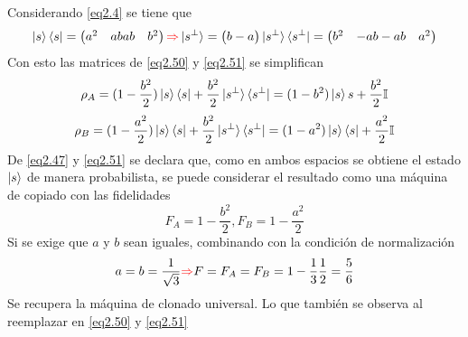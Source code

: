\documentclass{book}
\begin{document}
Considerando \ref{eq2.4} se tiene que 
\begin{equation}\label{eq2.52}{\ket{s}\bra{s}=\begin{pmatrix} a^2 & ab  ab & b^2 \end{pmatrix} \textcolor{red}{\Rightarrow}  \ket{s^\perp}=\begin{pmatrix}b  -a \end{pmatrix} \ket{s^\perp}\bra{s^\perp}=\begin{pmatrix} b^2 & -ab -ab & a^2\end{pmatrix} }\end{equation}
Con esto las matrices de \ref{eq2.50} y \ref{eq2.51} se simplifican
\begin{equation}\label{eq2.53}{\rho_A=(1-\frac{b^2}{2})\ket{s}\bra{s}+ \frac{b^2}{2}\ket{s^\perp}\bra{s^\perp}=(1-b^2)\ket{s}{s}+\frac{b^2}{2} \mathbb{I}}\end{equation}
\begin{equation} \label{eq2.54}{ \rho_B= (1-\frac{a^2}{2})\ket{s}\bra{s}+\frac{b^2}{2}\ket{s^\perp} \bra{s^\perp} =(1-a^2)\ket{s}\bra{s}+\frac{a^2}{2}\mathbb{I}}\end{equation} 
De \ref{eq2.47} y \ref{eq2.51} se declara que, como en ambos espacios se obtiene el estado $\ket{s}$ de manera probabilista, se puede considerar el resultado como una  máquina de copiado con las fidelidades
\begin{equation} \label{eq2.55}{ F_A=1-\frac{b^2}{2}, F_B=1-\frac{a^2}{2}}\end{equation}
Si se exige que $a$ y $b$ sean iguales, combinando con la condición de normalización
\begin{equation} \label{eq2.56}{ a=b=\frac{1}{\sqrt{3}} \textcolor{red}{\Rightarrow} F=F_A=F_B=1-\frac{1}{3}\frac{1}{2}=\frac{5}{6} }\end{equation} 
Se recupera la máquina de clonado universal. Lo que también se observa al reemplazar en \ref{eq2.50} y \ref{eq2.51}
\end{document}
